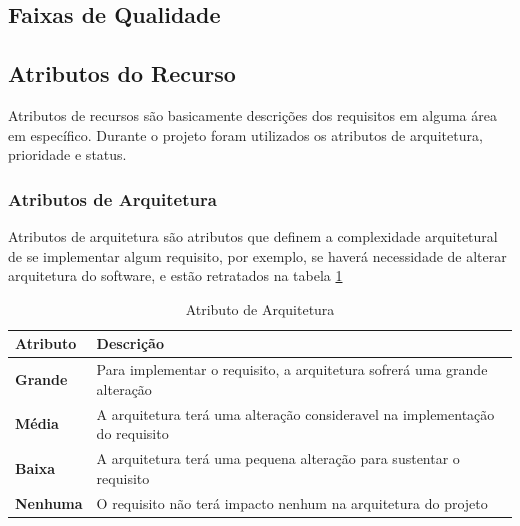 
\subsection{Faixas de Qualidade}


\subsection{Atributos do Recurso}

Atributos de recursos são basicamente descrições dos requisitos em alguma área em específico. Durante o projeto foram utilizados os atributos de arquitetura, prioridade e status.

\subsubsection{Atributos de Arquitetura\\}

Atributos de arquitetura são atributos que definem a complexidade arquitetural de se implementar algum requisito, por exemplo, se haverá necessidade de alterar arquitetura do software, e estão retratados na tabela \ref{tab:atributo_arquitetura}

\begin{table}[H]
\begin{tabular}{|p{4cm}|p{11cm}|}
\hline
\textbf{Atributo} &
\textbf{Descrição}
\\ \hline

\textbf{Grande} &
Para implementar o requisito, a arquitetura sofrerá uma grande alteração
\\ \hline

\textbf{Média} &
A arquitetura terá uma alteração consideravel na implementação do requisito
\\ \hline

\textbf{Baixa} &
A arquitetura terá uma pequena alteração para sustentar o requisito
\\ \hline

\textbf{Nenhuma} &
O requisito não terá impacto nenhum na arquitetura do projeto
\\ \hline
\end{tabular}
\caption{Atributo de Arquitetura}
\label{tab:atributo_arquitetura}
\end{table}

